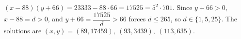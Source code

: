 $(x-88)(y+66)=23333-88\cdot66=17525=5^2\cdot701$. Since $y+66>0$, $x-88=d>0$, and $y+66=\dfrac{17525}d>66$ forces $d\le265$, so $d\in\{1,5,25\}$. The solutions are $\boxed{(x,y)=(89,17459),\ (93,3439),\ (113,635)}$.
